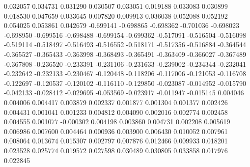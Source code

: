 0.032057
0.034731
0.031290
0.030507
0.033051
0.019188
0.033083
0.030899
0.018530
0.047659
0.033645
0.007820
0.009913
0.036038
0.052088
0.052192
0.054025
0.053861
0.042679
-0.699141
-0.698865
-0.698362
-0.701036
-0.698023
-0.698950
-0.699516
-0.698488
-0.699154
-0.699362
-0.517091
-0.516504
-0.516098
-0.519114
-0.518497
-0.516493
-0.516552
-0.518171
-0.517356
-0.516884
-0.364544
-0.365527
-0.365433
-0.363998
-0.368493
-0.365491
-0.363409
-0.366027
-0.367489
-0.367808
-0.236520
-0.233391
-0.231106
-0.231633
-0.239002
-0.234344
-0.232041
-0.232642
-0.232133
-0.230467
-0.120448
-0.118206
-0.117006
-0.121053
-0.116708
-0.122697
-0.120537
-0.120102
-0.116110
-0.129850
-0.023087
-0.014952
-0.015790
-0.042133
-0.028412
-0.029695
-0.053569
-0.023917
-0.011947
-0.015145
0.004046
0.004006
0.004417
0.003879
0.002337
0.001877
0.001304
0.001377
0.002426
0.004431
0.001041
0.001233
0.004812
0.004090
0.002016
0.002774
0.002458
0.004555
0.001077
-0.000302
0.004198
0.003860
0.004731
0.002208
0.005619
0.006986
0.007600
0.004464
0.000936
0.003900
0.006430
0.010052
0.007961
0.008064
0.013674
0.015307
0.002797
0.007876
0.012466
0.009933
0.018201
0.023528
0.025774
0.019572
0.027598
0.030489
0.030805
0.033858
0.017976
0.022845
